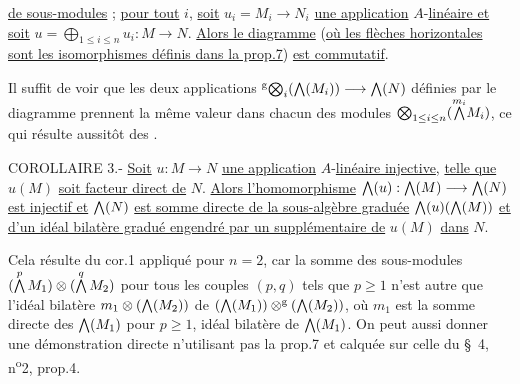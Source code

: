 \uline{de sous-modules} ; \uline{pour tout} $i$, \uline{soit} $u_i=M_i\to N_i$ \uline{une application} $A$-\uline{linéaire et soit} $u=\bigoplus_{1\leq i\leq n}u_i:M\longrightarrow N$. \uline{Alors le diagramme}
(\uline{où les flèches horizontales sont les isomorphismes définis dans la prop.7}) \uline{est commutatif}.

Il suffit de voir que les deux applications $ {}^{\mathrm g}\!\bigotimes_i(\bigwedge(M_i))\longrightarrow \bigwedge(N)$ définies par le diagramme prennent la même valeur dans chacun des modules $\bigotimes_{1\leq i\leq n}(\overset{m_i}{\bigwedge}M_i)$, ce qui résulte aussitôt des .

COROLLAIRE 3.- \uline{Soit} $u:M\to N$ \uline{une application} $A$-\uline{linéaire injective}, \uline{telle que} $u(M)$ \uline{soit facteur direct de} $N$. \uline{Alors l'homomorphisme} $\bigwedge(u):\bigwedge(M)\longrightarrow \bigwedge(N)$ \uline{est injectif et} $\bigwedge(N)$ \uline{est somme directe de la sous-algèbre graduée} $\bigwedge(u)(\bigwedge(M))$ \uline{et d'un idéal bilatère gradué engendré par un supplémentaire de} $u(M)$ \uline{dans} $N$.

Cela résulte du cor.1 appliqué pour $n=2$, car la somme des sous-modules $(\overset{p}{\bigwedge}\,M_1)\otimes(\overset{q}{\bigwedge}\,M_2)$ pour tous les couples $(p,q)$ tels que $p\geq 1$ n'est autre que l'idéal bilatère $m_1\otimes(\bigwedge(M_2))$ de $(\bigwedge(M_1))\otimes^{\mathrm g}(\bigwedge(M_2))$, où $m_1$ est la somme directe des $\bigwedge(M_1)$ pour $p\geq 1$, idéal bilatère de $\bigwedge(M_1)$. On peut aussi donner une démonstration directe n'utilisant pas la prop.7 et calquée sur celle du \S~4, n\textsuperscript{o}2, prop.4.

